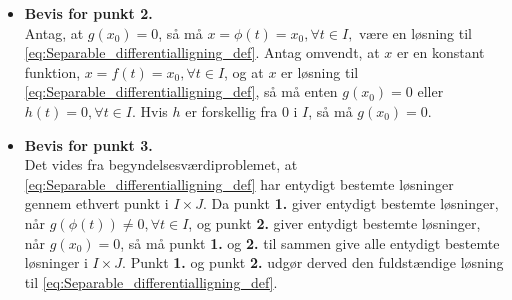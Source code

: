 \begin{bev}
\begin{itemize}
        Ud fra antagelserne om $G(x)$, findes der en invers funktion, $G^{-1}(x)$, så $x = \phi(t) = G^{-1}\left(H(t)\right)$. Da højresiden er differentiabel, er $\phi(t)$ også differentiabel på $I$. Ved at differentiere begge sider af $G(x)=H(t)+k$, med hensyn til $t$, og substituere $x=\phi(t)$ fås
       \begin{align*}
            G'(\phi(t))\phi'(t) &= H'(t)\\
            &\Downarrow\\
            \frac{\phi'(t)}{g(\phi(t)} &= h(t)\\
            &\Updownarrow\\
            \phi'(t) &= g(\phi(t))h(t)
            \intertext{$x=\phi(t)$ substitueres ind i udtrykket.}
            \frac{dx}{dt}&= g(x)h(t)
       \end{align*} 
       Dermed er det bevist, at \eqref{eq:punkt_1_separable_differentialligninger_sætning} er en løsning til \eqref{eq:Separable_differentialligning_def}.
        
            
        \item[] \textbf{Bevis for punkt 2.}\\     
        Antag, at $g(x_0)=0$, så må $x=\phi(t)=x_0, \forall t\in I,$ være en løsning til \eqref{eq:Separable_differentialligning_def}. Antag omvendt, at $x$ er en konstant funktion, $x = f(t) = x_0, \forall t\in I$, og at $x$ er løsning til \eqref{eq:Separable_differentialligning_def}, så må enten $g(x_0)=0$ eller $h(t)=0, \forall t\in I$. Hvis $h$ er forskellig fra $0$ i $I$, så må $g(x_0)=0$.
            

        \item[] \textbf{Bevis for punkt 3.}\\ 
            Det vides fra begyndelsesværdiproblemet, at \eqref{eq:Separable_differentialligning_def} har entydigt bestemte løsninger gennem ethvert punkt i $I\times J$. Da punkt \textbf{1.} giver entydigt bestemte løsninger, når $g(\phi(t)) \neq 0, \forall t\in I$, og punkt \textbf{2.} giver entydigt bestemte løsninger, når $g(x_0)=0$, så må punkt \textbf{1.} og \textbf{2.} til sammen give alle entydigt bestemte løsninger i $I \times J$. Punkt \textbf{1.} og punkt \textbf{2.} udgør derved den fuldstændige løsning til \eqref{eq:Separable_differentialligning_def}.
    \end{itemize}
\end{bev}

